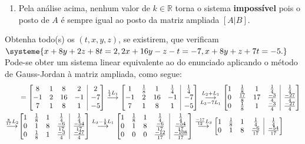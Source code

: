 \documentclass[12pt,a4paper]{article}
\makeatletter
\newcommand*\R{\mathbb{R}}
\newenvironment{amatrix}[1]{%
  \left[\begin{array}{@{}*{#1}{c}|c@{}}
}{%
  \end{array}\right]
}
\newcommand{\grstep}[2][\relax]{%
   \ensuremath{\mathrel{
       {\mathop{\longrightarrow}\limits^{#2\mathstrut}_{
                                     \begin{subarray}{l} #1 \end{subarray}}}}}}
\makeatother
\begin{document}
\begin{ExerciseList}
\begin{enumerate}
\item Pela análise acima, nenhum valor de $k \in \R$ torna o sistema \textbf{impossível} pois o posto de $A$ é sempre igual ao posto da matriz ampliada $[A|B]$.
\end{enumerate}

\Exercise[title={2,0}] Obtenha todo(s) os $(t,x,y,z)$, se existirem, que verificam $
\systeme{
x+8y+2z+8t=2,
2x+16y-z-t=-7,
x+8y+z+7t=-5.
}$
\Answer Pode-se obter um sistema linear equivalente ao do enunciado aplicando o método de Gauss-Jordan à matriz ampliada, como segue:
\begin{align*}
[A|B]
& =
\begin{amatrix}{4}
8 & 1 & 8 & 2 & 2 \\
-1 & 2 & 16 & -1 & -7 \\
7 & 1 & 8 & 1 & -5
\end{amatrix}
\grstep{ \frac{1}{4}L_1 }
\begin{amatrix}{4}
1 & \frac{1}{8} & 1 & \frac{1}{4} & \frac{1}{4} \\
-1 & 2 & 16 & -1 & -7 \\
7 & 1 & 8 & 1 & -5
\end{amatrix}
\grstep[ L_3 - 7 L_1 ]{ L_2 + L_1 }
\begin{amatrix}{4}
1 & \frac{1}{8} & 1 & \frac{1}{4} & \frac{1}{4} \\
0 & \frac{17}{8} & 17 & \frac{-3}{4} & \frac{-27}{4} \\
0 & \frac{1}{8} & 1 & \frac{-3}{4} & \frac{-27}{4}
\end{amatrix} \\
\grstep{ \frac{8}{17} L_2 }
&
\begin{amatrix}{4}
1 & \frac{1}{8} & 1 & \frac{1}{4} & \frac{1}{4} \\
0 & 1 & 8 & \frac{-6}{17} & \frac{-54}{17} \\
0 & \frac{1}{8} & 1 & \frac{-3}{4} & \frac{-27}{4}
\end{amatrix}
\grstep{ L_3 -\frac{1}{8} L_1 }
\begin{amatrix}{4}
1 & \frac{1}{8} & 1 & \frac{1}{4} & \frac{1}{4} \\
0 & 1 & 8 & \frac{-6}{17} & \frac{-54}{17} \\
0 & 0 & 0 & \frac{-12}{17} & \frac{-108}{17}
\end{amatrix}
\grstep{ \frac{-17}{12} L_3 }
\begin{amatrix}{4}
1 & \frac{1}{8} & 1 & \frac{1}{4} & \frac{1}{4} \\
0 & 1 & 8 & \frac{-6}{17} & \frac{-54}{17} \\

\end{amatrix}
\end{align*}
\end{ExerciseList}
\end{document}
